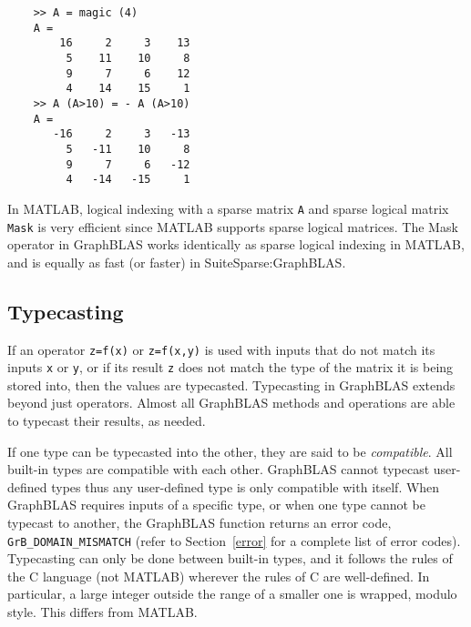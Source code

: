 \documentclass[12pt]{article}
\begin{document}
    \begin{mdframed}
    {\footnotesize
    \begin{verbatim}
    >> A = magic (4)
    A =
        16     2     3    13
         5    11    10     8
         9     7     6    12
         4    14    15     1
    >> A (A>10) = - A (A>10) 
    A =
       -16     2     3   -13
         5   -11    10     8
         9     7     6   -12
         4   -14   -15     1 \end{verbatim} } \end{mdframed}

In MATLAB, logical indexing with a sparse matrix \verb'A' and sparse logical
matrix \verb'Mask' is very efficient since MATLAB supports sparse logical
matrices.  The Mask operator in GraphBLAS works identically as sparse logical
indexing in MATLAB, and is equally as fast (or faster) in SuiteSparse:GraphBLAS.

\subsection{Typecasting} %
\label{typecasting}

If an operator \verb'z=f(x)' or \verb'z=f(x,y)' is used with inputs that do not
match its inputs \verb'x' or \verb'y', or if its result \verb'z' does not match
the type of the matrix it is being stored into, then the values are typecasted.
Typecasting in GraphBLAS extends beyond just operators.  Almost all GraphBLAS
methods and operations are able to typecast their results, as needed.

If one type can be typecasted into the other, they are said to be {\em
compatible}.  All built-in types are compatible with each other.  GraphBLAS
cannot typecast user-defined types thus any user-defined type is only
compatible with itself.  When GraphBLAS requires inputs of a specific type, or
when one type cannot be typecast to another, the GraphBLAS function returns an
error code, \verb'GrB_DOMAIN_MISMATCH' (refer to Section~\ref{error} for a
complete list of error codes).  Typecasting can only be done between built-in
types, and it follows the rules of the C language (not MATLAB) wherever the
rules of C are well-defined.   In particular, a large integer outside the range
of a smaller one is wrapped, modulo style.  This differs from MATLAB.
\end{document}
